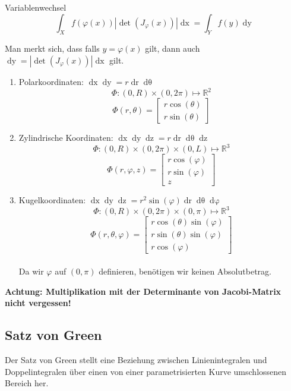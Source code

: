 \documentclass[a4paper,10pt]{article}
\def\R{\mathbb{R}}
\def\dx{\mathop{dx}}
\def\dy{\mathop{dy}}
\begin{document}
\begin{mainbox}{Variablenwechsel}
  $$\int_X f(\varphi(x)) | \det(J_\varphi(x)) | \dx = \int_Y f(y) \dy$$
\end{mainbox}

Man merkt sich, dass falls $y = \varphi(x)$ gilt, dann auch $\dy = | \det(J_\varphi(x)) | \dx$ gilt.

\begin{enumerate}
  \item{
    Polarkoordinaten: \(\mathop{dx}\mathop{dy} = r \mathop{dr} \mathop{d\theta}\)\\
    $$\varPhi: (0, R) \times (0, 2\pi) \mapsto \R^2$$
    $$\varPhi(r, \theta) = \begin{bmatrix}
      r \cos(\theta) \\
      r \sin(\theta)
    \end{bmatrix}$$
  }
  \item{
    Zylindrische Koordinaten: \(\mathop{dx} \mathop{dy} \mathop{dz} = r \mathop{dr} \mathop{d\theta} \mathop{dz}\)\\
    $$\varPhi: (0, R) \times (0, 2\pi) \times (0, L) \mapsto \R^3$$
    $$\varPhi(r, \varphi, z) = \begin{bmatrix}
      r \cos(\varphi) \\
      r \sin(\varphi) \\
      z
    \end{bmatrix}$$
  }
  \item{
    Kugelkoordinaten: \(\mathop{dx}\mathop{dy}\mathop{dz} = r^2 \sin(\varphi) \mathop{dr} \mathop{d\theta} \mathop{d\varphi}\)\\
    $$\varPhi: (0, R) \times (0, 2\pi) \times (0, \pi) \mapsto \R^3$$
    $$\varPhi(r, \theta, \varphi) = \begin{bmatrix}
      r \cos(\theta) \sin(\varphi) \\
      r \sin(\theta) \sin(\varphi) \\
      r \cos(\varphi)
    \end{bmatrix}$$\\
    Da wir $\varphi$ auf $(0, \pi)$ definieren, benötigen wir keinen Absolutbetrag.
  }
\end{enumerate}

\textbf{Achtung: Multiplikation mit der Determinante von Jacobi-Matrix nicht vergessen!}

\subsection{Satz von Green}
Der Satz von Green stellt eine Beziehung zwischen Linienintegralen und Doppelintegralen über einen von einer parametrisierten Kurve umschlossenen Bereich her. 
\end{document}
